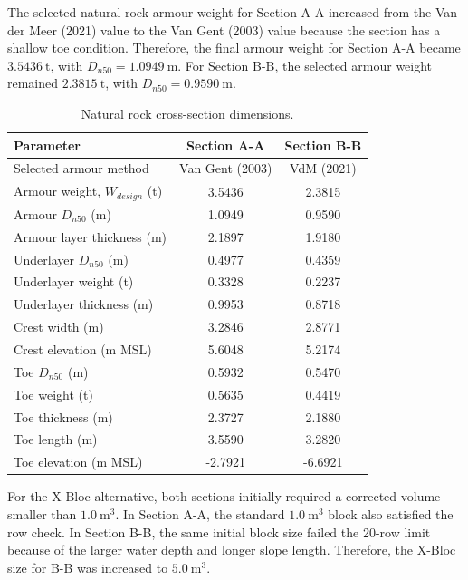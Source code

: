 \documentclass[a4paper, 11pt]{article}
\begin{document}
The selected natural rock armour weight for Section A-A increased from the Van der Meer (2021) value to the Van Gent (2003) value because the section has a shallow toe condition. Therefore, the final armour weight for Section A-A became \(3.5436~\mathrm{t}\), with \(D_{n50}=1.0949~\mathrm{m}\). For Section B-B, the selected armour weight remained \(2.3815~\mathrm{t}\), with \(D_{n50}=0.9590~\mathrm{m}\).

\begin{table}[H]
\centering
\caption{Natural rock cross-section dimensions.}
\label{tab:rmbw_rock_section}
\begin{tabular}{l c c}
\hline
Parameter & Section A-A & Section B-B \\
\hline
Selected armour method & Van Gent (2003) & VdM (2021) \\
Armour weight, \(W_{design}\) (t) & 3.5436 & 2.3815 \\
Armour \(D_{n50}\) (m) & 1.0949 & 0.9590 \\
Armour layer thickness (m) & 2.1897 & 1.9180 \\
Underlayer \(D_{n50}\) (m) & 0.4977 & 0.4359 \\
Underlayer weight (t) & 0.3328 & 0.2237 \\
Underlayer thickness (m) & 0.9953 & 0.8718 \\
Crest width (m) & 3.2846 & 2.8771 \\
Crest elevation (m MSL) & 5.6048 & 5.2174 \\
Toe \(D_{n50}\) (m) & 0.5932 & 0.5470 \\
Toe weight (t) & 0.5635 & 0.4419 \\
Toe thickness (m) & 2.3727 & 2.1880 \\
Toe length (m) & 3.5590 & 3.2820 \\
Toe elevation (m MSL) & -2.7921 & -6.6921 \\
\hline
\end{tabular}
\end{table}

For the X-Bloc alternative, both sections initially required a corrected volume smaller than \(1.0~\mathrm{m^3}\). In Section A-A, the standard \(1.0~\mathrm{m^3}\) block also satisfied the row check. In Section B-B, the same initial block size failed the 20-row limit because of the larger water depth and longer slope length. Therefore, the X-Bloc size for B-B was increased to \(5.0~\mathrm{m^3}\).
\end{document}
